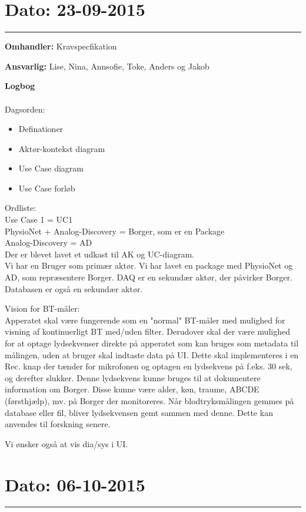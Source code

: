 \section{Dato: 23-09-2015 }
\hrule

\textbf{Omhandler:} Kravspecfikation 

\textbf{Ansvarlig:} Lise, Nina, Annsofie, Toke, Anders og Jakob

\textbf{Logbog}
\\
\\
Dagsorden:
\begin{itemize}
	\item Definationer
	\item Aktør-kontekst diagram
	\item Use Case diagram
	\item Use Case forløb
\end{itemize}

Ordliste:\\ 
Use Case 1 = UC1 \\
PhysioNet + Analog-Discovery = Borger, som er en Package \\
Analog-Discovery = AD \\


Der er blevet lavet et udkast til AK og UC-diagram. \\
Vi har en Bruger som primær aktør. Vi har lavet en package med PhysioNet og AD, som repræsentere Borger. DAQ er en sekundær aktør, der påvirker Borger. Databasen er også en sekundær aktør. 


Vision for BT-måler:\\
Apperatet skal være fungerende som en "normal" BT-måler med mulighed for visning af kontinuerligt BT med/uden filter. Derudover skal der være mulighed for at optage lydsekvenser direkte på apperatet som kan bruges som metadata til målingen, uden at bruger skal indtaste data på UI. Dette skal implementeres i en Rec. knap der tænder for mikrofonen og optagen en lydsekvens på f.eks. 30 sek, og derefter slukker. Denne lydsekvens kunne bruges til at dokumentere information om Borger. Disse kunne være alder, køn, traume, ABCDE (førsthjælp), mv. på Borger der monitoreres. 
Når blodtryksmålingen gemmes på database eller fil, bliver lydsekvensen gemt sammen med denne. Dette kan anvendes til forskning senere. 


Vi ønsker også at vis dia/sys i UI. 


\section{Dato: 06-10-2015 }
\hrule

